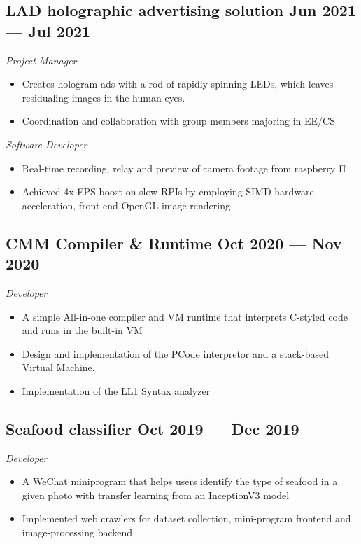 \documentclass[a4,12pt]{article}
\newcommand{\subtext}[1]{
#1\par\vspace{-0.2cm}}
\newenvironment{zitemize}{
\begin{itemize}\itemsep0pt \parskip0pt \parsep1pt}
{\end{itemize}\vspace{-0.5cm}}
\begin{document}
\subsection*{LAD holographic advertising solution \hfill \textbf{Jun 2021 --- Jul 2021}}
\subtext{\textit{Project Manager}}
\begin{zitemize}
    \item  Creates hologram ads with a rod of rapidly spinning LEDs, which leaves residualing images in the human eyes. 
    \item Coordination and collaboration with group members majoring in EE/CS
\end{zitemize}

\vspace{0.3cm}
\subtext{\textit{Software Developer}}
\begin{zitemize}
    \item Real-time recording, relay and preview of camera footage from raspberry Π
    \item Achieved 4x FPS boost on slow RPIs by employing SIMD hardware acceleration, front-end OpenGL image rendering
\end{zitemize}

\subsection*{CMM Compiler \& Runtime  \hfill \textbf{Oct 2020 --- Nov 2020}}
\subtext{\textit{Developer}}
\begin{zitemize}
    \item  A simple All-in-one compiler and VM runtime that interprets C-styled code and runs in the built-in VM
    \item Design and implementation of the PCode interpretor and a stack-based Virtual Machine.
    \item Implementation of the LL1 Syntax analyzer
\end{zitemize}

\subsection*{Seafood classifier \hfill \textbf{Oct 2019 --- Dec 2019}}
\subtext{\textit{Developer}}
\begin{zitemize}
    \item A WeChat miniprogram that helps users identify the type of seafood in a given photo with transfer learning from an InceptionV3 model 
    \item Implemented web crawlers for dataset collection, mini-program frontend and image-processing backend
\end{zitemize}
\end{document}
